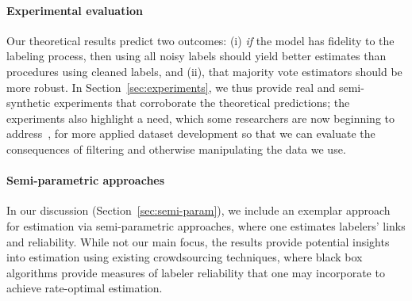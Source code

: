 \paragraph{Experimental evaluation}
Our theoretical results predict two outcomes: (i) \emph{if} the
model has fidelity to the labeling process, then using all noisy labels
should yield better estimates than procedures using cleaned labels, and
(ii), that majority vote estimators should be more robust. In
Section~\ref{sec:experiments}, we thus provide real and semi-synthetic
experiments that corroborate the theoretical predictions; the experiments
also highlight a need, which some researchers are now beginning to
address~\cite{GadreEtAl23}, for more applied dataset development so that we
can evaluate the consequences of filtering and otherwise manipulating the
data we use.

\paragraph{Semi-parametric approaches}
In our discussion (Section~\ref{sec:semi-param}), we include an exemplar
approach for estimation via semi-parametric approaches, where
one estimates labelers' links and reliability.
%
While not our main focus, the results provide potential insights into
estimation using existing crowdsourcing techniques, where black box
algorithms provide measures of labeler reliability that one may incorporate
to achieve rate-optimal estimation.


